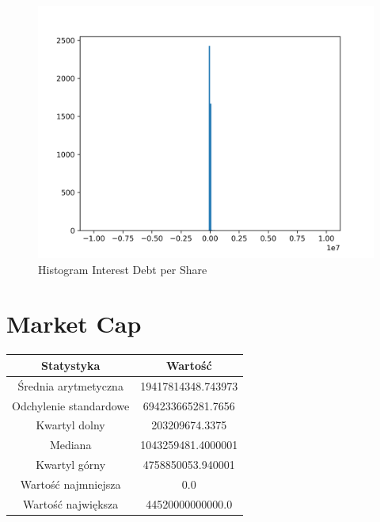 \documentclass{article}
\begin{document}
\begin{figure}[h!]
    \includegraphics[width=\linewidth]{variables/Interest Debt per Share.png}
    \caption{Histogram Interest Debt per Share }
\end{figure}\section{ Market Cap }

\begin{center}
    \begin{tabular}{|c | c|} 
    \hline
    Statystyka & Wartość \\
    \hline\hline
    Średnia arytmetyczna & 19417814348.743973 \\ 
    \hline
    Odchylenie standardowe & 694233665281.7656 \\
    \hline
    Kwartyl dolny & 203209674.3375 \\
    \hline
    Mediana & 1043259481.4000001 \\
    \hline
    Kwartyl górny & 4758850053.940001 \\
    \hline
    Wartość najmniejsza & 0.0 \\
    \hline
    Wartość największa & 44520000000000.0 \\
    \hline
   \end{tabular}
\end{center}
\end{document}
